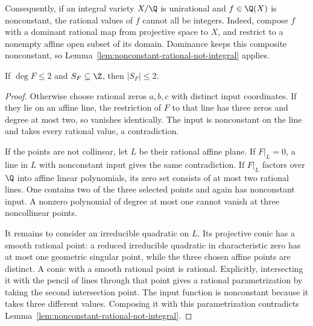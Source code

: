 Consequently, if an integral variety $X/\Q$ is unirational and
$f\in\Q(X)$ is nonconstant, the rational values of $f$ cannot all be
integers.  Indeed, compose $f$ with a dominant rational map from
projective space to $X$, and restrict to a nonempty affine open subset
of its domain.  Dominance keeps this composite nonconstant, so
Lemma~\ref{lem:nonconstant-rational-not-integral} applies.

\begin{lemma}\label{lem:quadratic-projection-finite}
If $\deg F\leq2$ and $S_F\subseteq\Z$, then $|S_F|\leq2$.
\end{lemma}
\begin{proof}
Otherwise choose rational zeros $a,b,c$ with distinct input
coordinates.  If they lie on an affine line, the restriction of $F$
to that line has three zeros and degree at most two, so vanishes
identically.  The input is nonconstant on the line and takes every
rational value, a contradiction.

If the points are not collinear, let $L$ be their rational affine
plane.  If $F|_L=0$, a line in $L$ with nonconstant input gives the same
contradiction.  If $F|_L$ factors over $\Q$ into affine linear
polynomials, its zero set consists of at most two rational lines.
One contains two of the three selected points and again has
nonconstant input.  A nonzero polynomial of degree at most one
cannot vanish at three noncollinear points.

It remains to consider an irreducible quadratic on $L$.  Its
projective conic has a smooth rational point: a reduced irreducible
quadratic in characteristic zero has at most one geometric singular
point, while the three chosen affine points are distinct.  A conic
with a smooth rational point is rational.  Explicitly, intersecting
it with the pencil of lines through that point gives a rational
parametrization by taking the second intersection point.  The input
function is nonconstant because it takes three different values.
Composing it with this parametrization contradicts
Lemma~\ref{lem:nonconstant-rational-not-integral}.
\end{proof}

